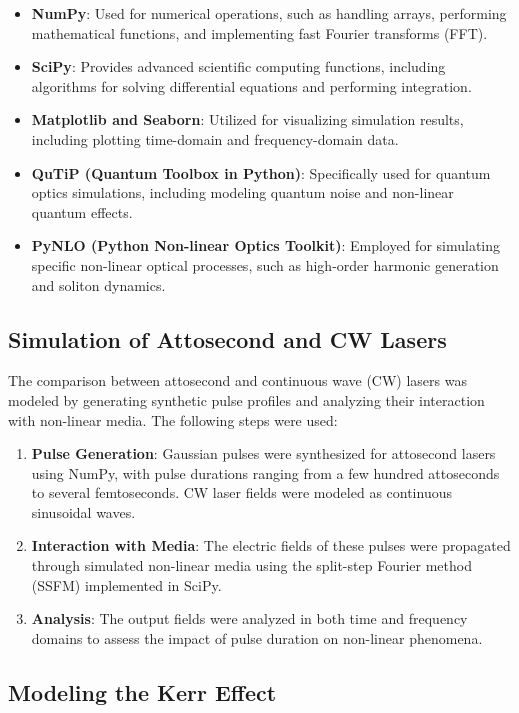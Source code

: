\documentclass[12pt]{article}
\begin{document}
\begin{itemize}
    \item \textbf{NumPy}: Used for numerical operations, such as handling arrays, performing mathematical functions, and implementing fast Fourier transforms (FFT).
    \item \textbf{SciPy}: Provides advanced scientific computing functions, including algorithms for solving differential equations and performing integration.
    \item \textbf{Matplotlib and Seaborn}: Utilized for visualizing simulation results, including plotting time-domain and frequency-domain data.
    \item \textbf{QuTiP (Quantum Toolbox in Python)}: Specifically used for quantum optics simulations, including modeling quantum noise and non-linear quantum effects.
    \item \textbf{PyNLO (Python Non-linear Optics Toolkit)}: Employed for simulating specific non-linear optical processes, such as high-order harmonic generation and soliton dynamics.
\end{itemize}

\subsection{Simulation of Attosecond and CW Lasers}

The comparison between attosecond and continuous wave (CW) lasers was modeled by generating synthetic pulse profiles and analyzing their interaction with non-linear media. The following steps were used:

\begin{enumerate}
    \item \textbf{Pulse Generation}: Gaussian pulses were synthesized for attosecond lasers using NumPy, with pulse durations ranging from a few hundred attoseconds to several femtoseconds. CW laser fields were modeled as continuous sinusoidal waves.
    \item \textbf{Interaction with Media}: The electric fields of these pulses were propagated through simulated non-linear media using the split-step Fourier method (SSFM) implemented in SciPy.
    \item \textbf{Analysis}: The output fields were analyzed in both time and frequency domains to assess the impact of pulse duration on non-linear phenomena.
\end{enumerate}

\subsection{Modeling the Kerr Effect}
\end{document}
